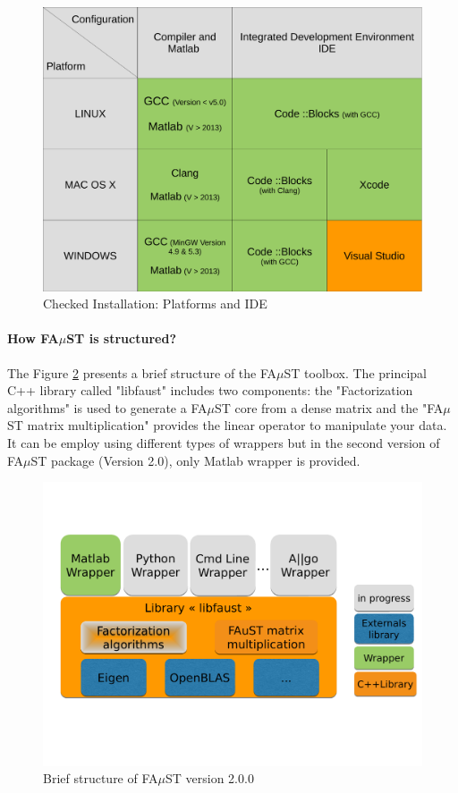 \begin{figure}[H] %
\centering
\includegraphics[scale=0.4]{images/recapInstall.pdf}
\caption{Checked Installation: Platforms and IDE}
\label{fig:recapInstall}
\end{figure}

\paragraph{How FA$\mu$ST is structured?}
The Figure \ref{fig:faustStructure} presents a brief structure of the FA$\mu$ST toolbox. The principal C++ library called "libfaust" includes two components: the "Factorization algorithms" is used to generate a FA$\mu$ST core from a dense matrix and the "FA$\mu$ST matrix multiplication" provides the linear operator to manipulate your data. It can be employ using different types of wrappers but in the second version of FA$\mu$ST package (Version 2.0), only Matlab wrapper is provided. 


\begin{figure}[H] %
\centering
\includegraphics[scale=0.45,trim = 0cm 5cm 0cm 4cm, clip]{images/FaustStructure.pdf}
\caption{Brief structure of FA$\mu$ST version 2.0.0}
\label{fig:faustStructure}
\end{figure}

